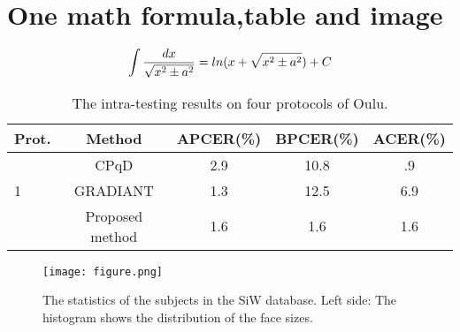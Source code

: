 \documentclass[10pt,twocolumn,letterpaper]{article}
\begin{document}
\section{One math formula,table and image}
\begin{equation}
\int \frac{d x}{\sqrt{x^2 \pm a^2}} =ln (x+ \sqrt{x^2 \pm a^2} )+C\\
\end{equation}



\begin{table}
\begin{center}
\begin{tabular}{|l|c|c|c|c|}
\hline
Prot. & Method &APCER(\%)&BPCER(\%)&ACER(\%) \\
\hline\hline
&CPqD & 2.9&10.8&.9\\ \cline{2-5}
1&GRADIANT &1.3 &12.5&6.9 \\ \cline{2-5}
 &Proposed method&1.6&1.6&1.6\\
\hline
\end{tabular}
\end{center}
\caption{The intra-testing results on four protocols of Oulu.}
\end{table}


\begin{figure}[t]
\begin{center}
\texttt{[image: figure.png]}
\end{center}
   \caption{The statistics of the subjects in the SiW database. Left
		side: The histogram shows the distribution of the face sizes.}
\label{fig:long}
\label{fig:onecol}
\end{figure}



{\small


}
\end{document}

